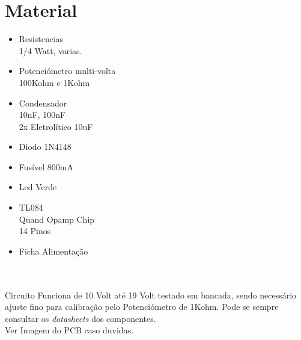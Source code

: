 \documentclass[titlepage, a4paper, 10pt, reqno, openany]{report}
\begin{document}
\section{Material}
\begin{minipage}[t]{.60\linewidth}
	\begin{itemize}
		\setlength\itemsep{-0.5em}
		\item Resistencias \\
		1/4 Watt, varias.
		\item Potenciómetro multi-volta \\
		100Kohm e 1Kohm
		\item Condensador \\
		10nF, 100nF  \\
		2x Eletrolítico 10uF
		\item Diodo 1N4148 \\
		\item Fusível 800mA \\
		\item Led Verde \\
	\end{itemize}
\end{minipage}
\begin{minipage}[t]{.31\linewidth}
	\begin{itemize}
		\setlength\itemsep{-0.5em}
		\item TL084 \\
		Quand Opamp Chip \\
		14 Pinos \\
		\item Ficha Alimentação \\
	\end{itemize}
\end{minipage}\\
\\
Circuito Funciona de 10 Volt até 19 Volt testado em bancada, sendo necessário ajuste fino para calibração pelo Potenciómetro de  1Kohm. 
Pode se sempre consultar os {\it datasheets} dos componentes.\\

Ver Imagem do PCB caso duvidas. \\
\end{document}
